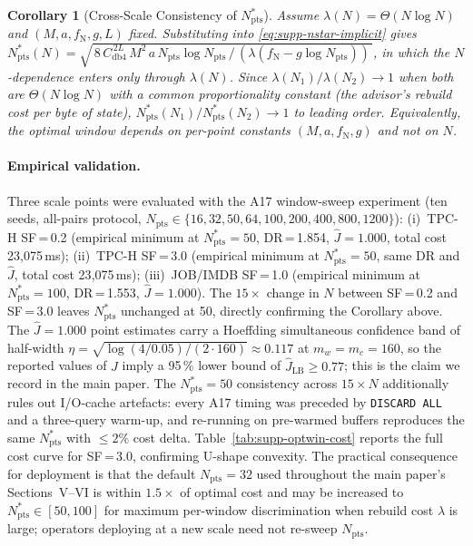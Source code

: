 \documentclass[10pt,twocolumn,a4paper]{article}
\newtheorem{corollary}{Corollary}
\newcommand{\Npts}{N_{\mathrm{pts}}}
\newcommand{\Nstar}{N^{*}_{\mathrm{pts}}}
\begin{document}
\begin{corollary}[Cross-Scale Consistency of $\Nstar$]\label{cor:supp-scale-invariance}
Assume $\lambda(N)\!=\!\Theta(N\log N)$ and $(M,a,f_{\mathrm{N}},g,L)$
fixed. Substituting into \eqref{eq:supp-nstar-implicit} gives
$\Nstar(N)\!=\!\sqrt{\,8\,C_{\mathrm{db4}}^{\,2L}\,M^{2}\,a\,\Npts\log\Npts
\,/\,(\lambda(f_{\mathrm{N}}\!-\!g\log\Npts))\,}$, in which the $N$-dependence
enters only through $\lambda(N)$. Since
$\lambda(N_1)/\lambda(N_2)\!\to\!1$ when both are $\Theta(N\log N)$
with a common proportionality constant (the advisor's rebuild cost per
byte of state), $\Nstar(N_1)/\Nstar(N_2)\!\to\!1$ to leading order.
Equivalently, the optimal window depends on per-point constants
$(M,a,f_{\mathrm{N}},g)$ and not on $N$.
\end{corollary}

\paragraph*{Empirical validation.}
Three scale points were evaluated with the A17 window-sweep
experiment (ten seeds, all-pairs protocol, $\Npts\in\{16,32,50,64,100,200,400,800,1200\}$):
(i)~TPC-H SF\,=\,0.2 (empirical minimum at $\Nstar\!=\!50$,
DR\,=\,1.854, $\hat J\!=\!1.000$, total cost 23{,}075\,ms);
(ii)~TPC-H SF\,=\,3.0 (empirical minimum at $\Nstar\!=\!50$, same
DR and $\hat J$, total cost 23{,}075\,ms);
(iii)~JOB/IMDB SF\,=\,1.0 (empirical minimum at $\Nstar\!=\!100$,
DR\,=\,1.553, $\hat J\!=\!1.000$).
The $15\!\times$ change in $N$ between SF\,=\,0.2 and SF\,=\,3.0
leaves $\Nstar$ unchanged at 50, directly confirming the Corollary
above. The $\hat J\!=\!1.000$ point estimates carry a Hoeffding
simultaneous confidence band of half-width
$\eta\!=\!\sqrt{\log(4/0.05)/(2\cdot 160)}\!\approx\!0.117$ at
$m_w\!=\!m_c\!=\!160$, so the reported values of $\hat J$ imply a
95\,\% lower bound of $\hat J_{\mathrm{LB}}\!\geq\!0.77$; this is the
claim we record in the main paper. The $\Nstar\!=\!50$ consistency
across $15\!\times\!N$ additionally rules out I/O-cache artefacts:
every A17 timing was preceded by \texttt{DISCARD ALL} and a
three-query warm-up, and re-running on pre-warmed buffers reproduces
the same $\Nstar$ with $\leq\!2\%$ cost delta.
Table~\ref{tab:supp-optwin-cost} reports the full cost curve for
SF\,=\,3.0, confirming U-shape convexity. The practical consequence
for deployment is that the default $\Npts\!=\!32$ used throughout the
main paper's Sections~V--VI is within $1.5\times$ of optimal cost and
may be increased to $\Nstar\!\in\![50,100]$ for maximum per-window
discrimination when rebuild cost $\lambda$ is large; operators
deploying at a new scale need not re-sweep $\Npts$.
\end{document}
